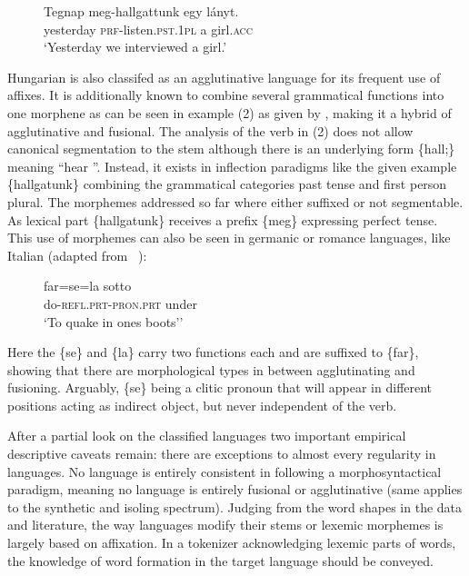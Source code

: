 \begin{figure}[h]
\centering
\label{fig:hun}
\begin{exe}
    \ex
    \gll  Tegnap meg-hallgattunk egy lányt. \\
    yesterday \textsc{prf}-listen.\textsc{pst.1pl} a girl.\textsc{acc}\\
    \glt  `Yesterday we interviewed a girl.'
\end{exe}
\end{figure}


Hungarian is also classifed as an agglutinative language for its frequent use of affixes.
It is additionally known to combine several grammatical functions into one morphene as can be seen in example (2) as given by \textcite[262]{hunverbs}, making it a hybrid of agglutinative and fusional.
The analysis of the verb in (2) does not allow canonical segmentation to the stem although there is an underlying form \{hall;\textasteriskcentered\} meaning \textquotedblleft hear \textquotedblright.
Instead, it exists in inflection paradigms like the given example \{hallgatunk\} combining the grammatical categories past tense and first person plural.
The morphemes addressed so far where either suffixed or not segmentable.
As lexical part \{hallgatunk\} receives a prefix \{meg\} expressing perfect tense.
This use of morphemes can also be seen in germanic or romance languages, like Italian (adapted from ~\textcite[163]{itaverbs}):

\begin{figure}[H]
\centering
    \label{fig:ita}
    \begin{exe}
        \ex
        \gll  far=se=la sotto \\
        do-\textsc{refl.prt}-\textsc{pron.prt} under\\
        \glt  `To quake in one\textquotesingle s boots’'
    \end{exe}
\end{figure}

Here the \{se\} and \{la\} carry two functions each and are suffixed to \{far\}, showing that there are morphological types in between agglutinating and fusioning.
Arguably, \{se\} being a clitic pronoun that will appear in different positions acting as indirect object, but never independent of the verb.


After a partial look on the classified languages two important empirical descriptive caveats remain: there are exceptions to almost every regularity in languages.
No language is entirely consistent in following a morphosyntactical paradigm, meaning no language is entirely fusional or agglutinative (same applies to the synthetic and isoling spectrum).
Judging from the word shapes in the data and literature, the way languages modify their stems or lexemic morphemes is largely based on affixation.
In a tokenizer acknowledging lexemic parts of words, the knowledge of word formation in the target language should be conveyed.